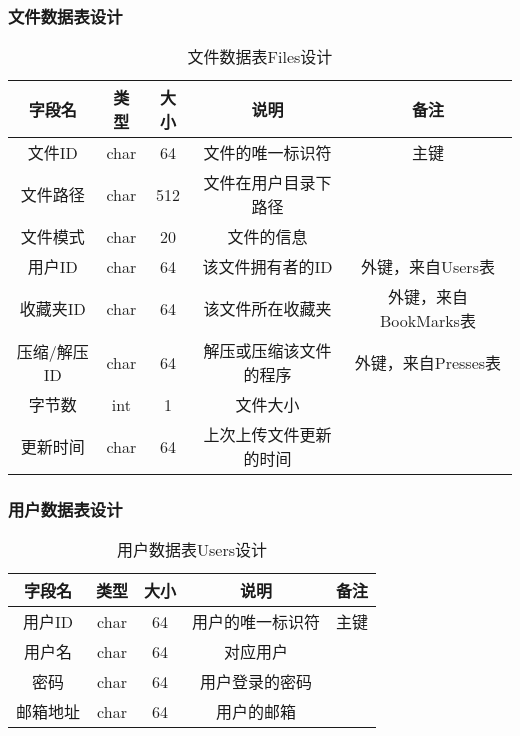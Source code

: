 \subsubsection{文件数据表设计}
\begin{table}[htbp]
\centering
\caption{文件数据表Files设计} \label{tab:files-database}
\begin{tabular}{|c|c|c|c|c|}
    \hline
    字段名 & 类型 & 大小 & 说明 & 备注 \\
    \hline
    文件ID & char & 64 & 文件的唯一标识符 & 主键\\
    \hline
    文件路径 & char & 512 & 文件在用户目录下路径 & \\
    \hline
    文件模式 & char & 20 & 文件的信息& \\
    \hline
    用户ID & char & 64 & 该文件拥有者的ID & 外键，来自Users表 \\
    \hline
    收藏夹ID & char & 64 & 该文件所在收藏夹 & 外键，来自BookMarks表 \\
    \hline
    压缩/解压ID & char & 64 & 解压或压缩该文件的程序 & 外键，来自Presses表 \\
    \hline
    字节数 & int & 1 & 文件大小 & \\
    \hline
    更新时间 & char & 64 & 上次上传文件更新的时间 & \\
    \hline
\end{tabular}
\end{table}

\subsubsection{用户数据表设计}
\begin{table}[htbp]
\centering
\caption{用户数据表Users设计} \label{tab:user-database}
\begin{tabular}{|c|c|c|c|c|}
    \hline
    字段名 & 类型 & 大小 & 说明 & 备注 \\
    \hline
    用户ID & char & 64 & 用户的唯一标识符 & 主键\\
    \hline
    用户名 & char & 64 & 对应用户 & \\
    \hline
    密码 & char & 64 & 用户登录的密码 & \\
    \hline
    邮箱地址 & char & 64 & 用户的邮箱 & \\
    \hline
\end{tabular}
\end{table}

